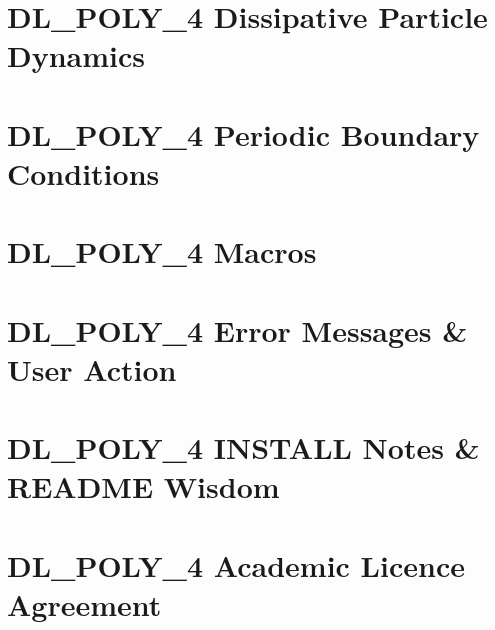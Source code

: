 \documentclass[11pt,a4paper,twoside,dvipdfmx,pdflatex,makeidx]{report}
\newcommand{\D}{{DL\_POLY\_4}\xspace}
\begin{document}





\appendix
{}

\chapter{\D Dissipative Particle Dynamics}


\chapter{\D Periodic Boundary Conditions}


\chapter{\D Macros}


\chapter{\D Error Messages \& User Action}


\chapter{\D INSTALL Notes \& README Wisdom}


\chapter{\D Academic Licence Agreement}






%




%

\cleardoublepage


\renewcommand{\see}[2]{\mbox{} \mbox{\textit{see} #1}}
\printindex

\newpage

\pagestyle{empty}
\cleardoublepage
\end{document}
